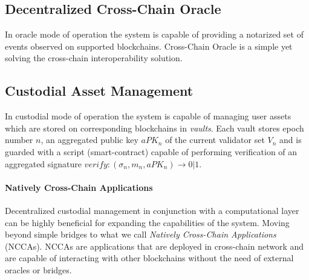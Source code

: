 \documentclass{article}
\begin{document}
\begin{sloppypar}
        \subsection{Decentralized Cross-Chain Oracle}\label{subsec:cross-chain-oracle}
        In oracle mode of operation the system is capable of providing a notarized set of events observed on supported blockchains.
        Cross-Chain Oracle is a simple yet solving the cross-chain interoperability solution.

        \subsection{Custodial Asset Management}\label{subsec:custodial-asset-management}
        In custodial mode of operation the system is capable of managing user assets which are stored on corresponding blockchains in \emph{vaults}.
        Each vault stores epoch number $n$, an aggregated public key $aPK_n$ of the current validator set $V_n$ and
        is guarded with a script (smart-contract) capable of performing verification of
        an aggregated signature ${verify: (\sigma_n, m_n, aPK_n) \rightarrow 0 | 1}$.

        \paragraph{Natively Cross-Chain Applications}
        Decentralized custodial management in conjunction with a computational layer can be highly beneficial for expanding the capabilities of the system.
        Moving beyond simple bridges to what we call \emph{Natively Cross-Chain Applications} (NCCAs).
        NCCAs are applications that are deployed in cross-chain network and are capable of interacting with other blockchains without the need of external oracles or bridges.

        \newpage

        \printbibliography
    \end{sloppypar}
\end{document}
